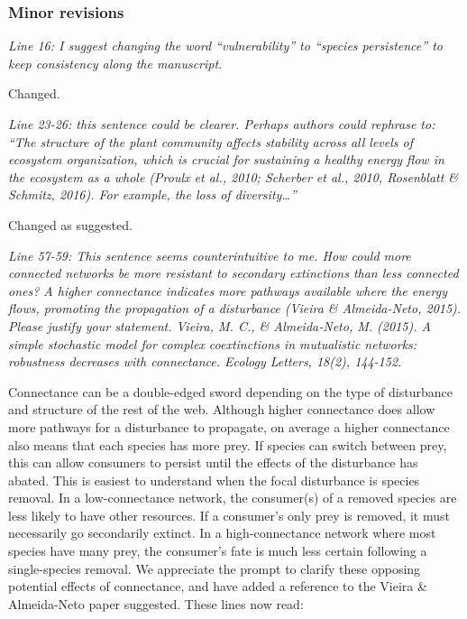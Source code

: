 \documentclass[12pt]{article}
\newcommand{\us}{\rm \setlength{\leftskip}{0.3cm} \setlength{\rightskip}{0.3cm}}
\newcommand{\them}{\it \setlength{\leftskip}{0cm} \setlength{\rightskip}{0cm}}
\begin{document}
    \subsubsection*{Minor revisions}

        \them
        Line 16: I suggest changing the word “vulnerability” to “species persistence” to keep consistency along the manuscript.
        
        \us
        Changed.
        
        \them
        Line 23-26: this sentence could be clearer. Perhaps authors could rephrase to: “The structure of the plant community affects stability across all levels of ecosystem organization, which is crucial for sustaining a healthy energy flow in the ecosystem as a whole (Proulx et al., 2010; Scherber et al., 2010, Rosenblatt \& Schmitz, 2016). For example, the loss of diversity…”
        
        \us Changed as suggested.
        
        \them
        Line 57-59: This sentence seems counterintuitive to me. How could more connected networks be more resistant to secondary extinctions than less connected ones? A higher connectance indicates more pathways available where the energy flows, promoting the propagation of a disturbance (Vieira \& Almeida-Neto, 2015). Please justify your statement.
        Vieira, M. C., \& Almeida‐Neto, M. (2015). A simple stochastic model for complex coextinctions in mutualistic networks: robustness decreases with connectance. Ecology Letters, 18(2), 144-152.
        
        \us Connectance can be a double-edged sword depending on the type of disturbance and structure of the rest of the web. Although higher connectance does allow more pathways for a disturbance to propagate, on average a higher connectance also means that each species has more prey. If species can switch between prey, this can allow consumers to persist until the effects of the disturbance has abated. This is easiest to understand when the focal disturbance is species removal. In a low-connectance network, the consumer(s) of a removed species are less likely to have other resources. If a consumer's only prey is removed, it must necessarily go secondarily extinct. In a high-connectance network where most species have many prey, the consumer's fate is much less certain following a single-species removal. We appreciate the prompt to clarify these opposing potential effects of connectance, and have added a reference to the Vieira \& Almeida-Neto paper suggested. These lines now read:
        
\end{document}
